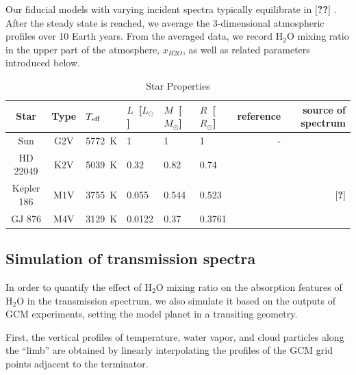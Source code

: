 \documentclass[11pt,numberedappendix,twocolappendix,]{emulateapj}
\def\water{H$_2$O }
\def\memo#1{\color{red}$[${\bf #1}$]$ \color{black}}
\begin{document}
Our fiducial models with varying incident spectra typically equilibrate in \memo{??}. 
After the steady state is reached, we average the 3-dimensional atmospheric profiles over 10 Earth years. 
From the averaged data, we record \water mixing ratio in the upper part of the atmosphere, $x_{H2O}$, as well as related parameters introduced below. 


\begin{table}[htp]
\caption{Star Properties}
\begin{center}
\begin{tabular}{ccllllrr} \hline \hline
%
Star & Type & $T_{\rm eff}$ & $L$~[$L_{\odot}$] & $M$~[$M_{\odot}$] & $R$~[$R_{\odot}$] & reference & source of spectrum \\ \hline
%
Sun & G2V & 5772~K & 1 & 1 & 1 & - & \citet{Kurucz1995} \\ 
%
HD 22049 & K2V & 5039~K & 0.32 & 0.82 & 0.74 & \citet{Baines2012} & \citet{Segura2003} \\
%
Kepler 186 & M1V & 3755~K & 0.055 & 0.544 & 0.523 & \citet{Torres2015} & \memo{?} \\
%
GJ 876 & M4V & 3129~K & 0.0122 & 0.37 & 0.3761 & \citet{vonBraun2014} & \citet{Domagal-Goldman2014} \\ \hline
\end{tabular}
\end{center}
\label{default}
\end{table}%


\subsection{Simulation of transmission spectra}

In order to quantify the effect of \water mixing ratio on the absorption features of \water in the transmission spectrum, 
we also simulate it based on the outputs of GCM experiments, setting the model planet in a transiting geometry. 

First, the vertical profiles of temperature, water vapor, and cloud particles along the ``limb'' are obtained by linearly interpolating the profiles of the GCM grid points adjacent to the terminator. 
\end{document}
